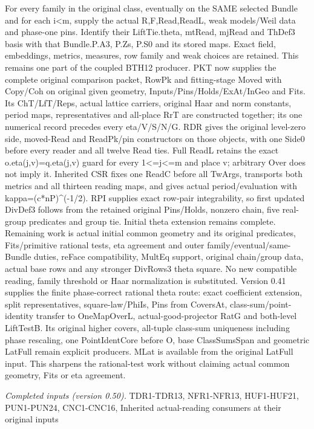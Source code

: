For every family in the original class, eventually on the SAME selected Bundle and for each i<m, supply the actual R,F,Read,ReadL, weak models/Weil data and phase-one pins. Identify their LiftTie.theta, mtRead, mjRead and ThDef3 basis with that Bundle.P.A3, P.Zs, P.S0 and its stored maps. Exact field, embeddings, metrics, measures, row family and weak choices are retained. This remains one part of the coupled BTH12 producer. PKT now supplies the complete original comparison packet, RowPk and fitting-stage Moved with Copy/Coh on original given geometry, Inputs/Pins/Holds/ExAt/InGeo and Fits. Its ChT/LfT/Reps, actual lattice carriers, original Haar and norm constants, period maps, representatives and all-place RrT are constructed together; its one numerical record precedes every eta/V/S/N/G. RDR gives the original level-zero side, moved-Read and ReadPk/pin constructors on those objects, with one Side0 before every reader and all twelve Read ties. Full ReadL retains the exact o.eta(j,v)=q.eta(j,v) guard for every 1<=j<=m and place v; arbitrary Over does not imply it. Inherited CSR fixes one ReadC before all TwArgs, transports both metrics and all thirteen reading maps, and gives actual period/evaluation with kappa=(c*nP)\textasciicircum{}(-1/2). RPI supplies exact row-pair integrability, so first updated DivDef3 follows from the retained original Pins/Holds, nonzero chain, five real-group predicates and group tie. Initial theta extension remains complete. Remaining work is actual initial common geometry and its original predicates, Fits/primitive rational tests, eta agreement and outer family/eventual/same-Bundle duties, reFace compatibility, MultEq support, original chain/group data, actual base rows and any stronger DivRows3 theta square. No new compatible reading, family threshold or Haar normalization is substituted. Version 0.41 supplies the finite phase-correct rational theta route: exact coefficient extension, split representatives, square-law/PhiIs, Pins from CoversAt, class-sum/point-identity transfer to OneMapOverL, actual-good-projector RatG and both-level LiftTestB. Its original higher covers, all-tuple class-sum uniqueness including phase rescaling, one PointIdentCore before O, base ClassSumsSpan and geometric LatFull remain explicit producers. MLat is available from the original LatFull input. This sharpens the rational-test work without claiming actual common geometry, Fits or eta agreement.

\emph{Completed inputs (version 0.50).} TDR1-TDR13, NFR1-NFR13, HUF1-HUF21, PUN1-PUN24, CNC1-CNC16, Inherited actual-reading consumers at their original inputs

